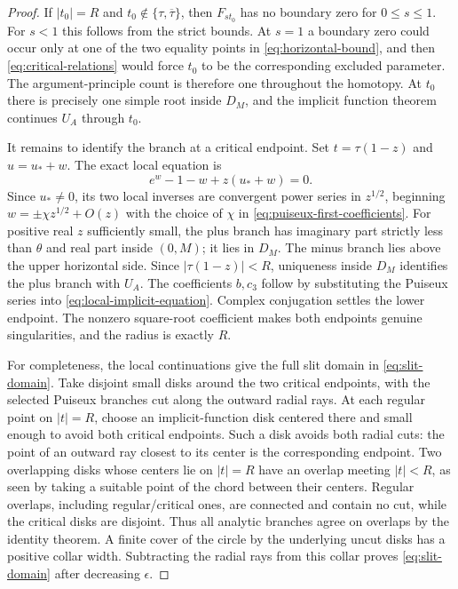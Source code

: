 \begin{proof}
If $|t_0|=R$ and $t_0\notin\{\tau,\overline\tau\}$, then
$F_{s t_0}$ has no boundary zero for $0\leq s\leq1$.  For $s<1$ this
follows from the strict bounds.  At $s=1$ a boundary zero could occur
only at one of the two equality points in \eqref{eq:horizontal-bound},
and then \eqref{eq:critical-relations} would force $t_0$ to be the
corresponding excluded parameter.  The argument-principle count is
therefore one throughout the homotopy.  At $t_0$ there is precisely one
simple root inside $D_M$, and the implicit function theorem continues
$U_A$ through $t_0$.

It remains to identify the branch at a critical endpoint.  Set
$t=\tau(1-z)$ and $u=u_*+w$.  The exact local equation is
\begin{equation}\label{eq:local-implicit-equation}
 e^w-1-w+z(u_*+w)=0.
\end{equation}
Since $u_*\neq0$, its two local inverses are convergent power series
in $z^{1/2}$, beginning $w=\pm\chi z^{1/2}+O(z)$ with the choice
of $\chi$ in \eqref{eq:puiseux-first-coefficients}.  For positive real
$z$ sufficiently small, the plus branch has imaginary part strictly
less than $\theta$ and real part inside $(0,M)$; it lies in $D_M$.
The minus branch lies above the upper horizontal side.  Since
$|\tau(1-z)|<R$, uniqueness inside $D_M$ identifies the plus branch
with $U_A$.  The coefficients $b,c_3$ follow by substituting the
Puiseux series into \eqref{eq:local-implicit-equation}.  Complex
conjugation settles the lower endpoint.  The nonzero square-root
coefficient makes both endpoints genuine singularities, and the
radius is exactly $R$.

For completeness, the local continuations give the full slit domain
in \eqref{eq:slit-domain}.  Take disjoint small disks around the two
critical endpoints, with the selected Puiseux branches cut along the
outward radial rays.  At each regular point on $|t|=R$, choose an
implicit-function disk centered there and small enough to avoid both
critical endpoints.  Such a disk avoids both radial cuts: the point
of an outward ray closest to its center is the corresponding endpoint.
Two overlapping disks whose centers lie on $|t|=R$ have an overlap
meeting $|t|<R$, as seen by taking a suitable point of the chord between
their centers.  Regular overlaps, including regular/critical ones,
are connected and contain no cut, while the critical disks are disjoint.
Thus all analytic branches agree on overlaps by the identity theorem.
A finite cover of the circle by the underlying uncut disks has a
positive collar width.  Subtracting the radial rays from this collar
proves \eqref{eq:slit-domain} after decreasing $\epsilon$.
\end{proof}

